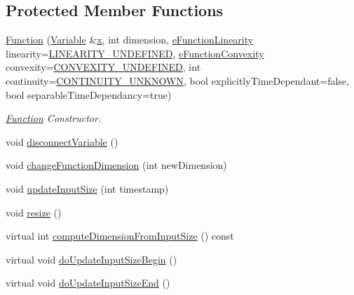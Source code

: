 \subsection*{Protected Member Functions}
\begin{DoxyCompactItemize}
\item 
\hyperlink{classocra_1_1Function_a34f827361369b0e38802fbc93a055014}{Function} (\hyperlink{classocra_1_1Variable}{Variable} \&\hyperlink{classocra_1_1Function_a28825886d1f149c87b112ec2ec1dd486}{x}, int dimension, \hyperlink{namespaceocra_a87b525b5508b0f6e9d931f14c7c226ab}{e\+Function\+Linearity} linearity=\hyperlink{namespaceocra_a87b525b5508b0f6e9d931f14c7c226abadd86a2dd3240e6df49a6e422b5abe075}{L\+I\+N\+E\+A\+R\+I\+T\+Y\+\_\+\+U\+N\+D\+E\+F\+I\+N\+ED}, \hyperlink{namespaceocra_ae6e8dca6121e9618486a449754876119}{e\+Function\+Convexity} convexity=\hyperlink{namespaceocra_ae6e8dca6121e9618486a449754876119a40aab88792841afe151808f879cfaa99}{C\+O\+N\+V\+E\+X\+I\+T\+Y\+\_\+\+U\+N\+D\+E\+F\+I\+N\+ED}, int continuity=\hyperlink{namespaceocra_ae5102ad1959d0c0dbf2eaa5610bbf728ad66557aadcf8856f9f135ff26db1a862}{C\+O\+N\+T\+I\+N\+U\+I\+T\+Y\+\_\+\+U\+N\+K\+N\+O\+WN}, bool explicitly\+Time\+Dependant=false, bool separable\+Time\+Dependancy=true)
\begin{DoxyCompactList}\small\item\em \hyperlink{classocra_1_1Function}{Function} Constructor. \end{DoxyCompactList}\item 
void \hyperlink{classocra_1_1Function_a0b0f0b2bf97e25130b51ed7b6c62c357}{disconnect\+Variable} ()
\item 
void \hyperlink{classocra_1_1Function_ad9800654d8a33fd91d7ea52038c2fb94}{change\+Function\+Dimension} (int new\+Dimension)
\item 
void \hyperlink{classocra_1_1Function_a3a5b9e6ae296339acc87ab2cbf97ef98}{update\+Input\+Size} (int timestamp)
\item 
void \hyperlink{classocra_1_1Function_aa59cd6d7965f6b2222261ef460d4899c}{resize} ()
\item 
virtual int \hyperlink{classocra_1_1Function_a95241fd426f887c5eb3add3f1e55a09c}{compute\+Dimension\+From\+Input\+Size} () const
\end{DoxyCompactItemize}
{\bf }\par
\begin{DoxyCompactItemize}
\item 
virtual void \hyperlink{classocra_1_1Function_a3f728f3758e6448aa59932853db5ddcc}{do\+Update\+Input\+Size\+Begin} ()
\item 
virtual void \hyperlink{classocra_1_1Function_a39f6d91b72eff2d32da7e4a85ee79f7d}{do\+Update\+Input\+Size\+End} ()
\end{DoxyCompactItemize}

